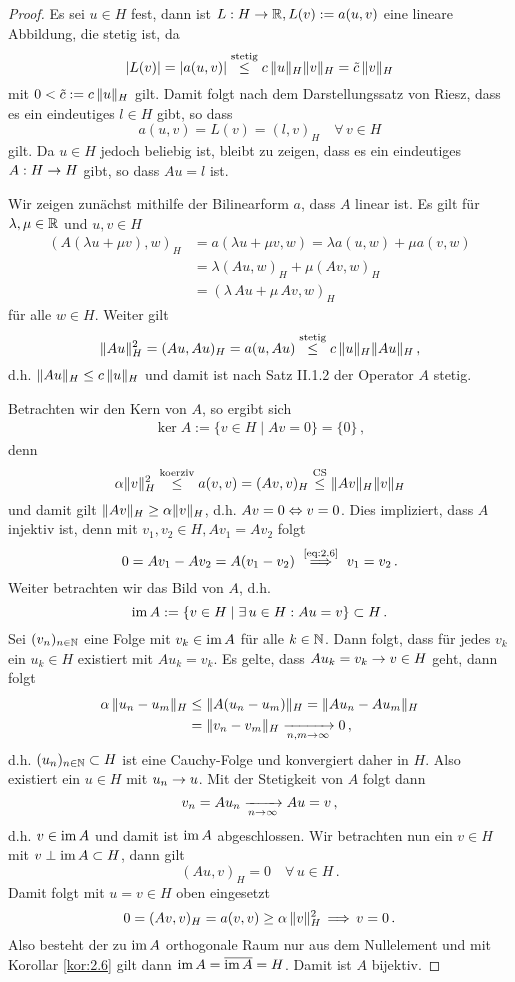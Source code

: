 \begin{proof}
Es sei $u\in H$ fest, dann ist $L: H\rightarrow \mathbb{R}, L(v) := a(u,v)$ eine lineare Abbildung, die stetig ist, da
\[
	\lvert L(v)\rvert = \lvert a(u,v)\rvert \stackrel{\scriptsize\text{stetig}}\le c \,  \lVert u\rVert_H \lVert v\rVert_H  = \tilde c\, \lVert v\rVert_H
\]
mit $0<\tilde c := c \, \lVert u\rVert_H$ gilt. Damit folgt nach dem Darstellungssatz von Riesz, dass es ein eindeutiges $l \in H$ gibt, so dass
\[
	a(u,v) = L(v) = (l,v)_H \quad \forall \, v \in H
\]
gilt. Da $u \in H$ jedoch beliebig ist, bleibt zu zeigen, dass es ein eindeutiges $A:H\rightarrow H$ gibt, so dass $Au = l$ ist.

Wir zeigen zunächst mithilfe der Bilinearform $a$, dass $A$ linear ist. Es gilt für $\lambda,\mu \in \mathbb{R}$ und $u,v \in H$
\begin{align*}
	(A(\lambda u + \mu v),w)_H &= a(\lambda u + \mu v, w) = \lambda a(u,w) + \mu a(v,w) \\
	& = \lambda (Au,w)_H + \mu(Av,w)_H \\
	& = (\lambda \, Au+\mu \, Av,w)_H
\end{align*}
für alle $w \in H$. Weiter gilt
\[
	\lVert Au\rVert_H^2 = (Au,Au)_H = a(u,Au) \stackrel{\scriptsize \text{stetig}}\le c \, \lVert u\rVert_H \lVert Au\rVert_H \, ,
\]
d.h. $\lVert Au\rVert_H \le c \, \lVert u\rVert_H$ und damit ist nach \cite{Werner} Satz II.1.2 der Operator $A$ stetig.

Betrachten wir den Kern von $A$, so ergibt sich
\begin{align}\label{eq:2.6}
	\ker A := \{ v \in H \mid Av = 0\} = \{0\} \, ,
\end{align}
denn
\[
	\alpha \lVert v\rVert_H^2 \stackrel{\scriptsize \text{koerziv}}\le a(v,v)  = (Av,v)_H \stackrel{\scriptsize \text{CS}}\le \lVert Av\rVert_H \lVert v\rVert_H 
\]
und damit gilt $\lVert Av\rVert_H \ge \alpha \lVert v\rVert_H$, d.h. $Av = 0 \Leftrightarrow v = 0$. Dies impliziert, dass $A$ injektiv ist, denn mit $v_1,v_2\in H, Av_1 = Av_2$ folgt
\[
	0 = Av_1 - Av_2 = A(v_1-v_2) \ \stackrel{\scriptsize\eqref{eq:2.6}}\lra \ v_1 = v_2 \, .
\]
Weiter betrachten wir das Bild von $A$, d.h.
\[
	\operatorname{im} A := \{ v \in H \mid \exists \, u \in H : Au = v \} \subset H\, .
\]
Sei $(v_n)_{n \in \mathbb{N}}$ eine Folge mit $v_k \in \operatorname{im} A $ für alle $k \in \mathbb{N}$. Dann folgt, dass für jedes $v_k$ ein $u_k \in H$ existiert mit $A u_k = v_k$. Es gelte, dass $Au_k = v_k \rightarrow v \in H$ geht, dann folgt
\begin{align*}
	\alpha \, \lVert u_n -u_m\rVert_H & \le \lVert A(u_n-u_m)\rVert_H = \lVert Au_n-Au_m\rVert_H \\
	& = \lVert v_n-v_m\rVert_H \xrightarrow[n,m\rightarrow \infty]{} 0 \, ,
\end{align*}
d.h. $(u_n)_{n\in \mathbb{N}} \subset H$ ist eine Cauchy-Folge und konvergiert daher in $H$. Also existiert ein $u \in H$ mit $u_n \rightarrow u$. Mit der Stetigkeit von $A$ folgt dann
\[
	v_n = A u_n \xrightarrow[n\rightarrow \infty]{} Au = v\, ,
\]
d.h. $v \in \operatorname{im} A$ und damit ist $\operatorname{im} A$ abgeschlossen. Wir betrachten nun ein $v \in H$ mit $v \perp \operatorname{im} A \subset H$, dann gilt
\[
	(Au,v)_H = 0 \quad \forall \, u \in H \, .
\]
Damit folgt mit $u = v \in H$ oben eingesetzt
\[
	 0 = (Av,v)_H = a(v,v) \ge \alpha \, \lVert v\rVert_H^2 \, \Longrightarrow \, v = 0 \, .
\]
Also besteht der zu $\operatorname{im} A$ orthogonale Raum nur aus dem Nullelement und mit Korollar \ref{kor:2.6} gilt dann $\operatorname{im} A = \overline{\operatorname{im} A} = H$. Damit ist $A$ bijektiv.


\end{proof}
